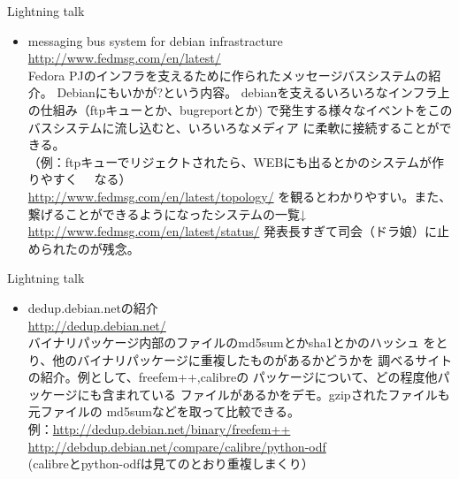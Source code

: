 \begin{frame}{Lightning talk}

\begin{itemize}
\item  messaging bus system for debian infrastracture\\
\url{http://www.fedmsg.com/en/latest/}\\
Fedora PJのインフラを支えるために作られたメッセージバスシステムの紹介。
Debianにもいかが?という内容。
debianを支えるいろいろなインフラ上の仕組み（ftpキューとか、bugreportとか)
で発生する様々なイベントをこのバスシステムに流し込むと、いろいろなメディア
に柔軟に接続することができる。\\
（例：ftpキューでリジェクトされたら、WEBにも出るとかのシステムが作りやすく
　なる）\\
\url{http://www.fedmsg.com/en/latest/topology/}
を観るとわかりやすい。また、\\
繋げることができるようになったシステムの一覧↓\\
\url{http://www.fedmsg.com/en/latest/status/}
発表長すぎて司会（ドラ娘）に止められたのが残念。
\end{itemize}
\end{frame}

\begin{frame}{Lightning talk}
\begin{itemize}
\item dedup.debian.netの紹介\\
\url{http://dedup.debian.net/}\\
バイナリパッケージ内部のファイルのmd5sumとかsha1とかのハッシュ
をとり、他のバイナリパッケージに重複したものがあるかどうかを
調べるサイトの紹介。例として、freefem++,calibreの
パッケージについて、どの程度他パッケージにも含まれている
ファイルがあるかをデモ。gzipされたファイルも元ファイルの
md5sumなどを取って比較できる。\\
例：\url{http://dedup.debian.net/binary/freefem++}\\
    \url{http://debdup.debian.net/compare/calibre/python-odf}\\
   (calibreとpython-odfは見てのとおり重複しまくり）\\
\end{itemize}
\end{frame}

